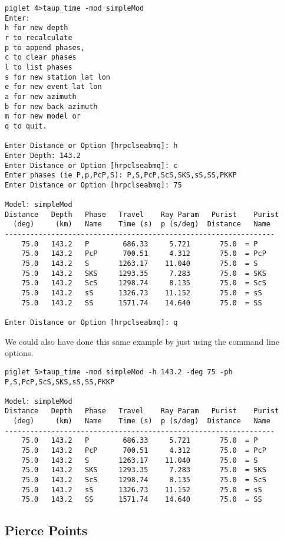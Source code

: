 \begin{verbatim}
piglet 4>taup_time -mod simpleMod
Enter:
h for new depth
r to recalculate
p to append phases, 
c to clear phases
l to list phases
s for new station lat lon
e for new event lat lon
a for new azimuth
b for new back azimuth
m for new model or 
q to quit.

Enter Distance or Option [hrpclseabmq]: h
Enter Depth: 143.2
Enter Distance or Option [hrpclseabmq]: c
Enter phases (ie P,p,PcP,S): P,S,PcP,ScS,SKS,sS,SS,PKKP
Enter Distance or Option [hrpclseabmq]: 75

Model: simpleMod
Distance   Depth   Phase   Travel    Ray Param   Purist    Purist
  (deg)     (km)   Name    Time (s)  p (s/deg)  Distance   Name
----------------------------------------------------------------
    75.0   143.2   P        686.33     5.721       75.0  = P    
    75.0   143.2   PcP      700.51     4.312       75.0  = PcP  
    75.0   143.2   S       1263.17    11.040       75.0  = S    
    75.0   143.2   SKS     1293.35     7.283       75.0  = SKS  
    75.0   143.2   ScS     1298.74     8.135       75.0  = ScS  
    75.0   143.2   sS      1326.73    11.152       75.0  = sS   
    75.0   143.2   SS      1571.74    14.640       75.0  = SS   

Enter Distance or Option [hrpclseabmq]: q
\end{verbatim}

We could also have done this same example by just using the command line
options.

\begin{verbatim}
piglet 5>taup_time -mod simpleMod -h 143.2 -deg 75 -ph P,S,PcP,ScS,SKS,sS,SS,PKKP

Model: simpleMod
Distance   Depth   Phase   Travel    Ray Param   Purist    Purist
  (deg)     (km)   Name    Time (s)  p (s/deg)  Distance   Name
----------------------------------------------------------------
    75.0   143.2   P        686.33     5.721       75.0  = P    
    75.0   143.2   PcP      700.51     4.312       75.0  = PcP  
    75.0   143.2   S       1263.17    11.040       75.0  = S    
    75.0   143.2   SKS     1293.35     7.283       75.0  = SKS  
    75.0   143.2   ScS     1298.74     8.135       75.0  = ScS  
    75.0   143.2   sS      1326.73    11.152       75.0  = sS   
    75.0   143.2   SS      1571.74    14.640       75.0  = SS
\end{verbatim}

\subsection{Pierce Points}

